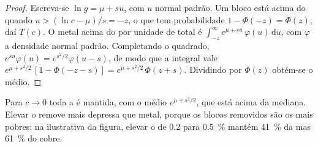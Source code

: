 \begin{proof}
Escreva-se $\ln g = \mu + s u$, com $u$ normal padrão. Um bloco está acima do  quando $u > (\ln c -
\mu)/s = -z$, o que tem probabilidade $1 - \Phi(-z) = \Phi(z)$; daí $T(c)$. O metal acima do
 por unidade de  total é $\int_{-z}^{\infty} e^{\mu + s u}\,\varphi(u)\,\mathrm{d}u$,
com $\varphi$ a densidade normal padrão. Completando o quadrado, $e^{su}\varphi(u) =
e^{s^2/2}\varphi(u - s)$, de modo que a integral vale $e^{\mu + s^2/2}\,[1 - \Phi(-z - s)] = e^{\mu +
s^2/2}\,\Phi(z + s)$. Dividindo por $\Phi(z)$ obtém-se o  médio.
\end{proof}

Para $c \to 0$ toda a  é mantida, com o  médio $e^{\mu + s^2/2}$, que está acima da
mediana. Elevar o  remove  mais depressa que metal, porque os blocos removidos são os
mais pobres: na  ilustrativa da figura, elevar o  de 0.2 para
\qty{0.5}{\percent} mantém \qty{41}{\percent} da  mas \qty{61}{\percent} do cobre.

